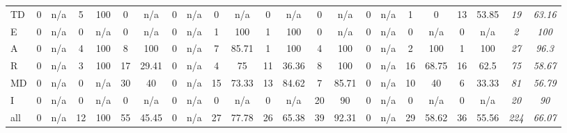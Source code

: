 \begin{screenonly}
\begin{table*}[h]
{{\begin{small}
\begin{tabular*}{\hsize}{@{\extracolsep{\fill}}lcccccccccccccccccccccc}
          \cmidrule(lr){2-3}\cmidrule(lr){4-5}\cmidrule(lr){6-7}\cmidrule(lr){8-9}\cmidrule(lr){10-11}\cmidrule(lr){12-13}\cmidrule(lr){14-15}
          \cmidrule(lr){16-17}\cmidrule(lr){18-19}\cmidrule(lr){20-21}\cmidrule(lr){22-23}
          TD & 0 & n/a & 5 & 100 & 0 & n/a & 0 & n/a & 0 & n/a & 0 & n/a & 0 & n/a & 0 & n/a & 1 & 0 & 13 & 53.85 & \emph{19} & \emph{63.16} \\
          E & 0 & n/a & 0 & n/a & 0 & n/a & 0 & n/a & 1 & 100 & 1 & 100 & 0 & n/a & 0 & n/a & 0 & n/a & 0 & n/a & \emph{2} & \emph{100} \\
          A & 0 & n/a & 4 & 100 & 8 & 100 & 0 & n/a & 7 & 85.71 & 1 & 100 & 4 & 100 & 0 & n/a & 2 & 100 & 1 & 100 & \emph{27} & \emph{96.3} \\
          R & 0 & n/a & 3 & 100 & 17 & 29.41 & 0 & n/a & 4 & 75 & 11 & 36.36 & 8 & 100 & 0 & n/a & 16 & 68.75 & 16 & 62.5 & \emph{75} & \emph{58.67} \\
          MD & 0 & n/a & 0 & n/a & 30 & 40 & 0 & n/a & 15 & 73.33 & 13 & 84.62 & 7 & 85.71 & 0 & n/a & 10 & 40 & 6 & 33.33 & \emph{81} & \emph{56.79} \\
          I & 0 & n/a & 0 & n/a & 0 & n/a & 0 & n/a & 0 & n/a & 0 & n/a & 20 & 90 & 0 & n/a & 0 & n/a & 0 & n/a & \emph{20} & \emph{90} \\
          \midrule
          all & 0 & n/a & 12 & 100 & 55 & 45.45 & 0 & n/a & 27 & 77.78 & 26 & 65.38 & 39 & 92.31 & 0 & n/a & 29 & 58.62 & 36 & 55.56 & \emph{224} & \emph{66.07} \\
          \bottomrule
        \end{tabular*}
      \end{small}
    }
  }
  \JoinCoffins\AccuFelTable[vc,hc]\AccuFelTableR[vc,hc]
\SetHorizontalCoffin {}
\end{table*}
\end{screenonly}
